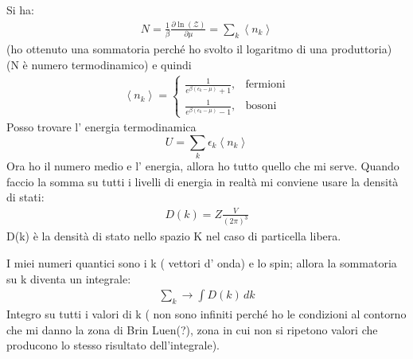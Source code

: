 Si ha:
\begin{equation}\begin{split}
N=\frac{1}{\beta}\frac{\partial \ln{\left(\mathcal{Z}\right)}}{\partial \mu}=\sum_k{\left\langle n_k \right\rangle}
\end{split}\end{equation}
(ho ottenuto una sommatoria perché ho svolto il logaritmo di una produttoria) (N è numero termodinamico) e quindi
\begin{equation}\begin{split}
\left\langle n_k \right\rangle=
\begin{cases}
\frac{1}{e^{\beta\left(\epsilon_k-\mu\right)}+1}, & \textrm{fermioni}\\
\frac{1}{e^{\beta\left(\epsilon_k-\mu\right)}-1}, & \textrm{bosoni}
\end{cases}
\end{split}\end{equation}
Posso trovare l' energia termodinamica $$U=\sum_k{\epsilon_k\left\langle n_k \right\rangle}$$
Ora ho il numero medio e l' energia, allora ho tutto quello che mi serve. Quando faccio la somma su tutti i livelli di energia in realtà mi conviene usare la densità di stati:
\begin{equation}\begin{split}
D\left(k\right)=Z\frac{V}{\left(2\pi\right)^3}
\end{split}\end{equation}
D(k) è la densità di stato nello spazio K nel caso di particella libera.

 I miei numeri quantici sono i k ( vettori d' onda) e lo spin; allora la sommatoria su k diventa un integrale:
\begin{equation}\begin{split} 
\sum_{k}\rightarrow \int D(k)\,dk
\end{split}\end{equation}
Integro su tutti i valori di k ( non sono infiniti perché ho le condizioni al contorno che mi danno la zona di Brin Luen(?), zona in cui non si ripetono valori che producono lo stesso risultato dell'integrale).

